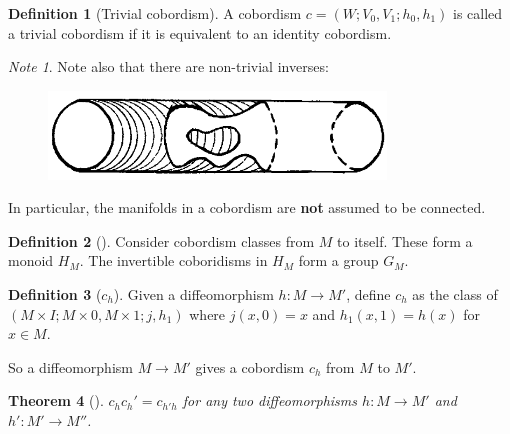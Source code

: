\documentclass[reqno]{amsart}
\newtheorem{theorem}{Theorem}[section]
\theoremstyle{definition}
\newtheorem{definition}[theorem]{Definition}
\theoremstyle{remark}
\newtheorem*{note}{Note}
\begin{document}
    \begin{definition}[Trivial cobordism]
        A cobordism $c = \left( W ; V_0, V_1; h_0,h_1 \right) $ 
        is called a trivial cobordism if it is
        equivalent to an identity cobordism.
    \end{definition}

    \begin{note}
        Note also that there
        are non-trivial inverses:
        \begin{figure}[htpb]
            \centering
            \includegraphics[width=0.8\textwidth]{cobordism-example-1.png}
            \label{fig:cobordism-example-1-png}
        \end{figure}
        In particular, the manifolds in a cobordism
        are \textbf{not} assumed to be connected.
    \end{note}

    \begin{definition}[]
        Consider cobordism classes from $M$ to itself.
        These form a monoid $H_M$. The invertible
        coboridisms in $H_M$ form a group $G_M$.
    \end{definition}

    \begin{definition}[$c_h$]
        Given a diffeomorphism
        $h \colon M \to M'$, define
        $c_h$ as the class of
        $\left( M \times I; M \times 0, M \times 1;
        j, h_1 \right) $ where
        $j (x,0) = x$ and
        $h_1 (x,1) = h(x)$ for $x \in M$.
    \end{definition}
    So a diffeomorphism
    $M \to M'$ gives a cobordism $c_h$ from $M$ to $M'$.

    \begin{theorem}[]
        $c_h c_h' = c_{h'h }$ for any two diffeomorphisms
        $h \colon M \to M'$ and
        $h' \colon M' \to M''$.
    \end{theorem}
\end{document}
